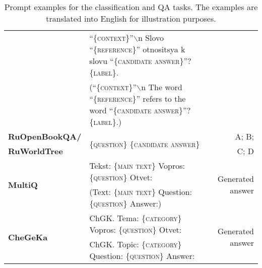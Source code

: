 \documentclass[11pt]{article}
\begin{document}
\begin{table*}[hb!]
{\begin{tabular}{llr}
    &  ``\textsc{\{context\}}''$\backslash$n Slovo ``\textsc{\{reference\}}'' otnositsya k slovu ``\textsc{\{candidate answer\}}''? \textsc{\{label\}}. & \\  
    &  (``\textsc{\{context\}}''$\backslash$n The word ``\textsc{\{reference\}}'' refers to the word ``\textsc{\{candidate answer\}}''? \textsc{\{label\}}.) & \\ \midrule
    
    \textbf{RuOpenBookQA/} &
    \multirow{2}{*}{\textsc{\{question\}} \textsc{\{candidate answer\}}}  & A; B;  \\ 
    \textbf{RuWorldTree} & & C; D
    \\ \midrule
  
    \multirow{2}{*}{\textbf{MultiQ}} & Tekst: \textsc{\{main text\}} Vopros: \textsc{\{question\}} Otvet: & \multirow{2}{*}{Generated answer}\\
    & (Text: \textsc{\{main text\}} Question: \textsc{\{question\}} Answer:) &
    \\ \midrule
    
    \multirow{2}{*}{\textbf{CheGeKa}} & ChGK. Tema: \textsc{\{category\}} Vopros: \textsc{\{question\}} Otvet: & \multirow{2}{*}{Generated answer}\\
    & ChGK. Topic: \textsc{\{category\}} Question: \textsc{\{question\}} Answer:& 
    \\ \bottomrule
    \end{tabular}
    }
    \caption{Prompt examples for the classification and QA tasks. The examples are translated into English for illustration purposes.}
    \label{tab:main_prompts}

\end{table*}
\end{document}

